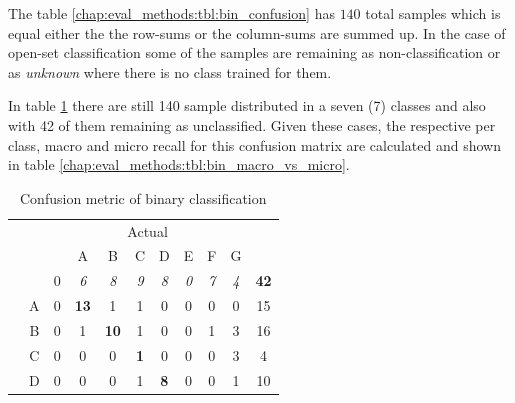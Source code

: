The table \ref{chap:eval_methods:tbl:bin_confusion} has $140$ total samples which is equal either the the row-sums or the column-sums are summed up. In the case of open-set classification some of the samples are remaining as non-classification or as \textit{unknown} where there is no class trained for them. 

In table \ref{chap:eval_methods:tbl:multi_confusion} there are still 140 sample distributed in a seven (7) classes and also with 42 of them remaining as unclassified. Given these cases, the respective per class, macro and micro recall for this confusion matrix are calculated and shown in table \ref{chap:eval_methods:tbl:bin_macro_vs_micro}.

\begin{table}[H]
	\center
	\caption{Confusion metric of binary classification}\label{chap:eval_methods:tbl:multi_confusion}
	\begin{tabular}{c c c c c c c c c c c}
		& & \multicolumn{8}{c}{Actual} & \\
		\cline{3-10}
		\multirow{10}{*}{\rotatebox[origin=c]{90}{Predicted}} & & \multicolumn{1}{|c}{\emptyset} & \multicolumn{1}{c}{A} & \multicolumn{1}{c}{B} & \multicolumn{1}{c}{C} & \multicolumn{1}{c}{D} & \multicolumn{1}{c}{E}  & \multicolumn{1}{c}{F} & \multicolumn{1}{c|}{G} & \\
		\cline{2-10}
		& \multicolumn{1}{|c}{\emptyset} & \multicolumn{1}{|c}{0} & \multicolumn{1}{c}{\textit{6}} & \multicolumn{1}{c}{\textit{8}} & \multicolumn{1}{c}{\textit{9}} & \multicolumn{1}{c}{\textit{8}} & \multicolumn{1}{c}{\textit{0}} & \multicolumn{1}{c}{\textit{7}} & \multicolumn{1}{c|}{\textit{4}} & \textbf{42} \\
		& \multicolumn{1}{|c}{A} & \multicolumn{1}{|c}{0} & \multicolumn{1}{c}{\textbf{13}} & \multicolumn{1}{c}{1} & \multicolumn{1}{c}{1} & \multicolumn{1}{c}{0} & \multicolumn{1}{c}{0} & \multicolumn{1}{c}{0} & \multicolumn{1}{c|}{0} & 15 \\
		& \multicolumn{1}{|c}{B} & \multicolumn{1}{|c}{0} & \multicolumn{1}{c}{1} & \multicolumn{1}{c}{\textbf{10}} & \multicolumn{1}{c}{1} & \multicolumn{1}{c}{0} & \multicolumn{1}{c}{0} & \multicolumn{1}{c}{1} & \multicolumn{1}{c|}{3} & 16 \\
		& \multicolumn{1}{|c}{C} & \multicolumn{1}{|c}{0} & \multicolumn{1}{c}{0} & \multicolumn{1}{c}{0} & \multicolumn{1}{c}{\textbf{1}} & \multicolumn{1}{c}{0} & \multicolumn{1}{c}{0} & \multicolumn{1}{c}{0} & \multicolumn{1}{c|}{3} & 4 \\
		& \multicolumn{1}{|c}{D} & \multicolumn{1}{|c}{0} & \multicolumn{1}{c}{0} & \multicolumn{1}{c}{0} & \multicolumn{1}{c}{1} & \multicolumn{1}{c}{\textbf{8}} & \multicolumn{1}{c}{0} & \multicolumn{1}{c}{0} & \multicolumn{1}{c|}{1} & 10 \\

\end{tabular}
\end{table}

